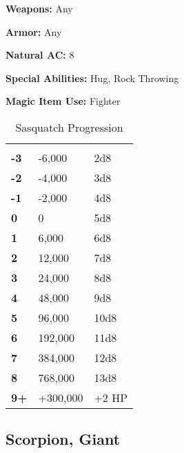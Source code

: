 \begin{multicols*}{2}
{\textbf{Weapons:} Any

\textbf{Armor:} Any

\textbf{Natural AC:} 8

\textbf{Special Abilities:} Hug, Rock Throwing

\textbf{Magic Item Use:} Fighter}

\begin {table}[H]
  \caption{Sasquatch Progression}
  \begin{tabularx}{\columnwidth}{>{\bfseries}YYY}
   &  & \\
	-3 & -6,000 & 2d8\\
	-2 & -4,000 & 3d8\\
	-1 & -2,000 & 4d8\\
	0 & 0 & 5d8\\
	1 & 6,000 & 6d8\\
	2 & 12,000 & 7d8\\
	3 & 24,000 & 8d8\\
	4 & 48,000 & 9d8\\
	5 & 96,000 & 10d8\\
	6 & 192,000 & 11d8\\
	7 & 384,000 & 12d8\\
	8 & 768,000 & 13d8\\
	9+ & +300,000 & +2 HP
  \end {tabularx}
\end {table}

\subsection{Scorpion, Giant}
\end{multicols*}
